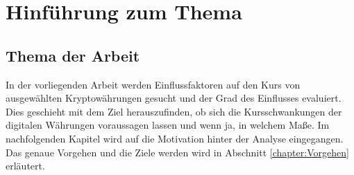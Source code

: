 \chapter{Hinführung zum Thema}

\section{Thema der Arbeit}
In der vorliegenden Arbeit werden Einflussfaktoren auf den Kurs von ausgewählten Kryptowährungen gesucht und der Grad des Einflusses evaluiert. Dies geschieht mit dem Ziel herauszufinden, ob sich die Kursschwankungen der digitalen Währungen voraussagen lassen und wenn ja, in welchem Maße. Im nachfolgenden Kapitel wird auf die Motivation hinter der Analyse eingegangen. Das genaue Vorgehen und die Ziele werden wird in Abschnitt \ref{chapter:Vorgehen} erläutert.

